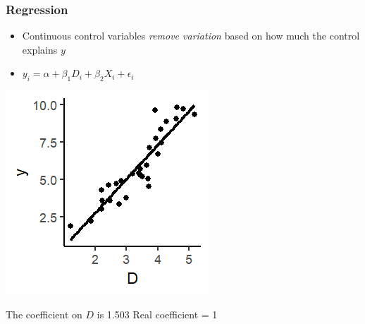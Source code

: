 \documentclass[xcolor=x11names,compress]{beamer}\usepackage[]{graphicx}\usepackage[]{color}
\makeatletter
\def\maxwidth{ %
  \ifdim\Gin@nat@width>\linewidth
    \linewidth
  \else
    \Gin@nat@width
  \fi
}
\newenvironment{knitrout}{}{} %
\renewcommand{\(}{\begin{columns}}
\renewcommand{\)}{\end{columns}}
\newcommand{\<}[1]{\begin{column}{#1}}
\renewcommand{\>}{\end{column}}
\makeatother
\begin{document}
\begin{frame}
\frametitle{Regression}
\begin{itemize}
\item Continuous control variables \textit{remove variation} based on how much the control explains $y$
\item $y_i = \alpha + \beta_1 D_i + \beta_2 X_i + \epsilon_i$
\end{itemize}
\begin{multicols}{2}
\begin{knitrout}
\color{fgcolor}
\includegraphics[width=\maxwidth]{figure/graph_ols_control1-1} 

\end{knitrout}
\columnbreak

The coefficient on $D$ is 1.503
Real coefficient = 1
\end{multicols}
\end{frame}
\end{document}
